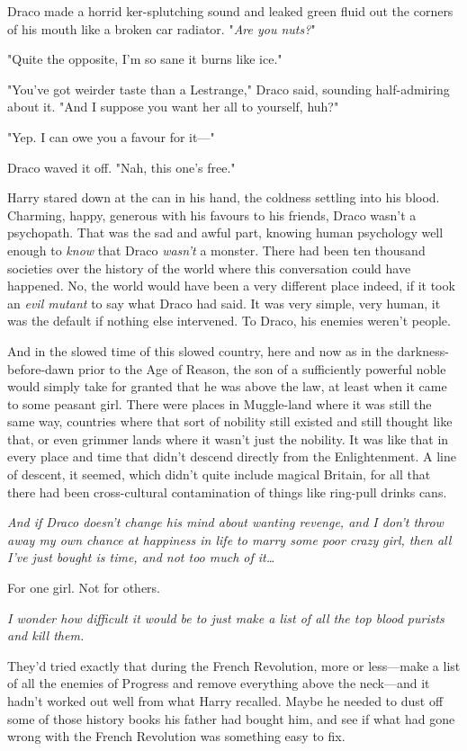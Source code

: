 Draco made a horrid ker-splutching sound and leaked green fluid out the corners
of his mouth like a broken car radiator. "\emph{Are you nuts?}"

"Quite the opposite, I'm so sane it burns like ice."

"You've got weirder taste than a Lestrange," Draco said, sounding half-admiring
about it. "And I suppose you want her all to yourself, huh?"

"Yep. I can owe you a favour for it---"

Draco waved it off. "Nah, this one's free."

Harry stared down at the can in his hand, the coldness settling into his blood.
Charming, happy, generous with his favours to his friends, Draco wasn't a
psychopath. That was the sad and awful part, knowing human psychology well
enough to \emph{know} that Draco \emph{wasn't} a monster. There had been ten
thousand societies over the history of the world where this conversation could
have happened. No, the world would have been a very different place indeed, if
it took an \emph{evil mutant} to say what Draco had said. It was very simple,
very human, it was the default if nothing else intervened. To Draco, his
enemies weren't people.

And in the slowed time of this slowed country, here and now as in the
darkness-before-dawn prior to the Age of Reason, the son of a sufficiently
powerful noble would simply take for granted that he was above the law, at
least when it came to some peasant girl. There were places in Muggle-land where
it was still the same way, countries where that sort of nobility still existed
and still thought like that, or even grimmer lands where it wasn't just the
nobility. It was like that in every place and time that didn't descend directly
from the Enlightenment. A line of descent, it seemed, which didn't quite
include magical Britain, for all that there had been cross-cultural
contamination of things like ring-pull drinks cans.

\emph{And if Draco doesn't change his mind about wanting revenge, and I don't
throw away my own chance at happiness in life to marry some poor crazy girl,
then all I've just bought is time, and not too much of it{\ldots}}

For one girl. Not for others.

\emph{I wonder how difficult it would be to just make a list of all the top
blood purists and kill them.}

They'd tried exactly that during the French Revolution, more or less---make a
list of all the enemies of Progress and remove everything above the neck---and
it hadn't worked out well from what Harry recalled. Maybe he needed to dust off
some of those history books his father had bought him, and see if what had gone
wrong with the French Revolution was something easy to fix.

